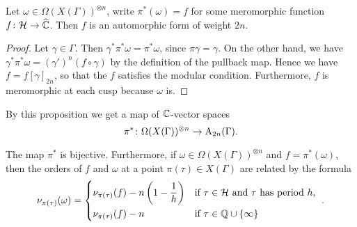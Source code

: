 \begin{prop}
 Let $\omega\in\Omega(X(\Gamma))^{\otimes n}$, write $\pi^*(\omega)=f$ for some meromorphic function $f\colon \mathcal{H}\to\widehat{\mathbb{C}}$. Then $f$ is an automorphic form of weight $2n$.
\end{prop}

\begin{proof}
 Let $\gamma\in\Gamma$. Then $\gamma^* \pi^* \omega = \pi^* \omega$, since $\pi \gamma = \gamma$. On the other hand, we have $\gamma^* \pi^* \omega = (\gamma')^n(f\circ\gamma)$ by the definition of the pullback map. Hence we have $f=f[\gamma]_{2n}$, so that the $f$ satisfies the modular condition. Furthermore, $f$ is meromorphic at each cusp because $\omega$ is.
\end{proof}

By this proposition we get a map of $\mathbb{C}$-vector spaces \[\pi^*\colon\Omega(X(\Gamma))^{\otimes n}\to\mathrm{A}_{2n}(\Gamma).\]

\begin{prop} \label{pr:bijection}
 The map $\pi^*$ is bijective. Furthermore, if $\omega\in\Omega(X(\Gamma))^{\otimes n}$ and $f=\pi^*(\omega)$, then the orders of $f$ and $\omega$ at a point $\pi(\tau)\in X(\Gamma)$ are related by the formula
 \[\nu_{\pi(\tau)}(\omega)=\begin{dcases*}\nu_{\pi(\tau)}(f)-n\left(1-\frac{1}{h}\right) & if $\tau\in\mc{H}$ and $\tau$ has period $h$, \\
 \nu_{\pi(\tau)}(f)-n & if $\tau\in\Qbb\cup\{\infty\}$\end{dcases*}.\]
\end{prop}


